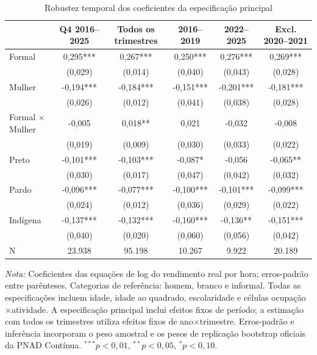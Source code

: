 \documentclass[12pt,a4paper]{article}
\begin{document}
\begin{table}[htbp]
\centering
\caption{Robustez temporal dos coeficientes da especificação principal}
\label{tab:robustez_temporal}
\scriptsize\singlespacing
\begin{tabular}{lccccc}
\toprule
 & Q4 2016--2025
 & Todos os trimestres
 & 2016--2019
 & 2022--2025
 & Excl. 2020--2021 \\
\midrule

Formal
& 0,295***
& 0,267***
& 0,250***
& 0,276***
& 0,269*** \\
&(0,029)
&(0,014)
&(0,040)
&(0,043)
&(0,028) \\[0.3em]

Mulher
& -0,194***
& -0,184***
& -0,151***
& -0,201***
& -0,181*** \\
&(0,026)
&(0,012)
&(0,041)
&(0,038)
&(0,028) \\[0.3em]

Formal $\times$ Mulher
& -0,005
& 0,018**
& 0,021
& -0,032
& -0,008 \\
&(0,019)
&(0,009)
&(0,030)
&(0,033)
&(0,022) \\[0.3em]

Preto
& -0,101***
& -0,103***
& -0,087*
& -0,056
& -0,065** \\
&(0,030)
&(0,017)
&(0,047)
&(0,042)
&(0,032) \\[0.3em]

Pardo
& -0,096***
& -0,077***
& -0,100***
& -0,101***
& -0,099*** \\
&(0,024)
&(0,012)
&(0,036)
&(0,029)
&(0,022) \\[0.3em]

Indígena
& -0,137***
& -0,132***
& -0,160***
& -0,136**
& -0,151*** \\
&(0,040)
&(0,020)
&(0,060)
&(0,056)
&(0,042) \\

\midrule
N
& 23.938
& 95.198
& 10.267
& 9.922
& 20.189 \\
\bottomrule
\end{tabular}

\vspace{0.15cm}
\begin{minipage}{0.97\textwidth}
\scriptsize
\textit{Nota:} Coeficientes das equações de log do rendimento real por hora;
erros-padrão entre parênteses. Categorias de referência: homem, branco e
informal. Todas as especificações
incluem idade, idade ao quadrado, escolaridade e células
ocupação$\times$atividade. A especificação principal inclui efeitos fixos de
período; a estimação com todos os trimestres utiliza efeitos fixos de
ano$\times$trimestre. Erros-padrão e inferência incorporam o peso amostral e
os pesos de replicação bootstrap oficiais da PNAD Contínua.
$^{***}p<0,01$, $^{**}p<0,05$, $^{*}p<0,10$.
\end{minipage}
\end{table}
\end{document}

